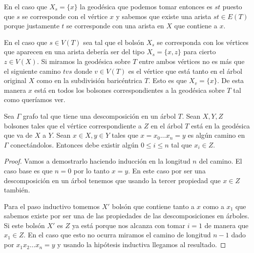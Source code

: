 \documentclass[tesis.tex]{subfiles}
\begin{document}
\begin{ej}
\begin{enumerate}
	En el caso que $X_s = \{ x \}$ la geodésica que podemos tomar entonces es $st$ puesto que $s$ se corresponde con el vértice $x$ y sabemos que existe una arista $st \in E(T)$ porque justamente $t$ se corresponde con una arista en $X$ que contiene a $x$.
	
	En el caso que $s \in V(T)$ sea tal que el bolsón $X_s$ se corresponda con los vértices que aparecen en una arista debería ser del tipo $X_s = \{x,z\}$ para cierto $z \in V(X)$. 
	Si miramos la geodésica sobre $T$ entre ambos vértices no es más que el siguiente camino $tvs$ donde $v \in V(T)$ es el vértice que está tanto en el árbol original $X$ como en la subdivisión baricéntrica $T$.
	Esto es que $X_v = \{ x \}$.
	De esta manera $x$ está en todos los bolsones correspondientes a la geodésica sobre $T$ tal como queríamos ver.	
\end{enumerate}
\end{ej}



\begin{prop}\label{prop-camino-desc}
	Sea $\Gamma$ grafo tal que tiene una descomposición en un árbol $T$.
	Sean $X,Y,Z$ bolsones tales que el vértice correspondiente a $Z$ en el árbol $T$ está en la geodésica que va de $X$ a $Y$. 
	Sean $x \in X, y \in Y$ tales que $x = x_0 \dots x_n=y$ es algún camino en $\Gamma$ conectándolos.
	Entonces debe existir algún $ 0 \le i \le n$ tal que $x_i \in Z$. 
\end{prop}

\begin{proof}
	Vamos a demostrarlo haciendo inducción en la longitud $n$ del camino. 
	El caso base es que $n = 0$ por lo tanto $x=y$. 
	En este caso por ser una descomposición en un árbol tenemos que usando la tercer propiedad que $x \in Z$ también.
	
	Para el paso inductivo tomemos $X'$ bolsón que contiene tanto a $x$ como a $x_1$ que sabemos existe por ser una de las propiedades de las descomposiciones en árboles.
	Si este bolsón $X'$ es $Z$ ya está porque nos alcanza con tomar $i=1$ de manera que $x_1 \in Z$.
	En el caso que esto no ocurra miramos el camino de longitud $n-1$ dado por $x_1 x_2 \dots x_n = y$ y usando la hipótesis inductiva llegamos al resultado.	
\end{proof}
\end{document}

